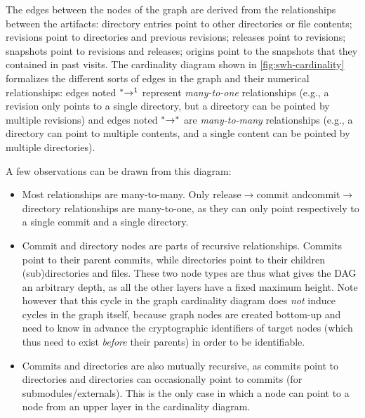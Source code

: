The edges between the nodes of the graph are derived from the relationships
between the artifacts: directory entries point to other directories or file
contents; revisions point to directories and previous revisions; releases point
to revisions; snapshots point to revisions and releases; origins point to the
snapshots that they contained in past visits.
The cardinality diagram shown in \cref{fig:swh-cardinality} formalizes the
different sorts of edges in the graph and their numerical relationships: edges
noted $\prescript{\ast}{}\rightarrow^1$ represent \emph{many-to-one}
relationships (e.g., a revision only points to a single directory, but a
directory can be pointed by multiple revisions) and edges noted
$\prescript{\ast}{}\rightarrow^\ast$ are \emph{many-to-many} relationships
(e.g., a directory can point to multiple contents, and a single content can be
pointed by multiple directories).

A few observations can be drawn from this diagram:

\begin{itemize}
    \item Most relationships are many-to-many. Only release$\to$commit
        and\linebreak commit$\to$directory relationships are many-to-one, as
        they can only point respectively to a single commit and a single
        directory.

    \item Commit and directory nodes are parts of recursive relationships.
        Commits point to their parent commits, while directories point to their
        children (sub)directories and files. These two node types are thus what
        gives the DAG an arbitrary depth, as all the other layers have a fixed
        maximum height. Note however that this cycle in the graph cardinality
        diagram does \emph{not} induce cycles in the graph itself, because
        graph nodes are created bottom-up and need to know in advance the
        cryptographic identifiers of target nodes (which thus need to
        exist \emph{before} their parents) in order to be identifiable.

    \item Commits and directories are also mutually recursive, as commits point
        to directories and directories can occasionally point to commits (for
        submodules/externals). This is the only case in which a node can point
        to a node from an upper layer in the cardinality diagram.
\end{itemize}


